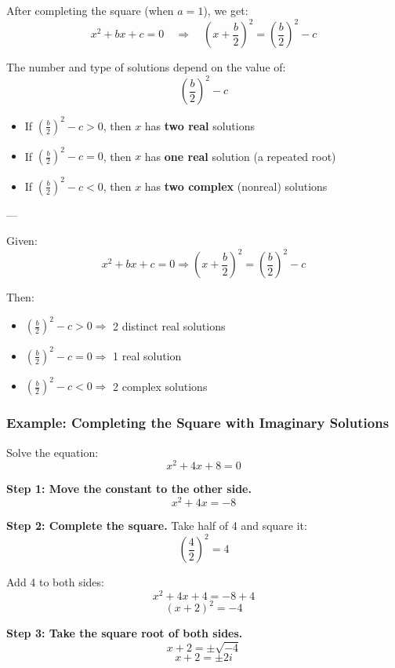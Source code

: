 \documentclass[11pt]{article}
\begin{document}
After completing the square (when \( a = 1 \)), we get:
\[
x^2 + bx + c = 0 \quad \Rightarrow \quad \left(x + \frac{b}{2}\right)^2 = \left( \frac{b}{2} \right)^2 - c
\]

The number and type of solutions depend on the value of:
\[
\left( \frac{b}{2} \right)^2 - c
\]

\begin{itemize}
  \item If \( \left( \frac{b}{2} \right)^2 - c > 0 \), then \( x \) has \textbf{two real} solutions
  \item If \( \left( \frac{b}{2} \right)^2 - c = 0 \), then \( x \) has \textbf{one real} solution (a repeated root)
  \item If \( \left( \frac{b}{2} \right)^2 - c < 0 \), then \( x \) has \textbf{two complex} (nonreal) solutions
\end{itemize}

---

\begin{tcolorbox}[title=Real vs Complex Solutions from Completing the Square, colback=cyan!5!white, colframe=cyan!80!black]
Given:
\[
x^2 + bx + c = 0 \Rightarrow \left(x + \frac{b}{2} \right)^2 = \left( \frac{b}{2} \right)^2 - c
\]

Then:
\begin{itemize}
  \item \( \left( \frac{b}{2} \right)^2 - c > 0 \Rightarrow \) 2 distinct real solutions
  \item \( \left( \frac{b}{2} \right)^2 - c = 0 \Rightarrow \) 1 real solution
  \item \( \left( \frac{b}{2} \right)^2 - c < 0 \Rightarrow \) 2 complex solutions
\end{itemize}
\end{tcolorbox}
\subsubsection*{Example: Completing the Square with Imaginary Solutions}

Solve the equation:
\[
x^2 + 4x + 8 = 0
\]

\textbf{Step 1: Move the constant to the other side.}
\[
x^2 + 4x = -8
\]

\textbf{Step 2: Complete the square.}
Take half of 4 and square it:
\[
\left( \frac{4}{2} \right)^2 = 4
\]

Add 4 to both sides:
\[
x^2 + 4x + 4 = -8 + 4
\]
\[
(x + 2)^2 = -4
\]

\textbf{Step 3: Take the square root of both sides.}
\[
x + 2 = \pm \sqrt{-4}
\]
\[
x + 2 = \pm 2i
\]
\end{document}

